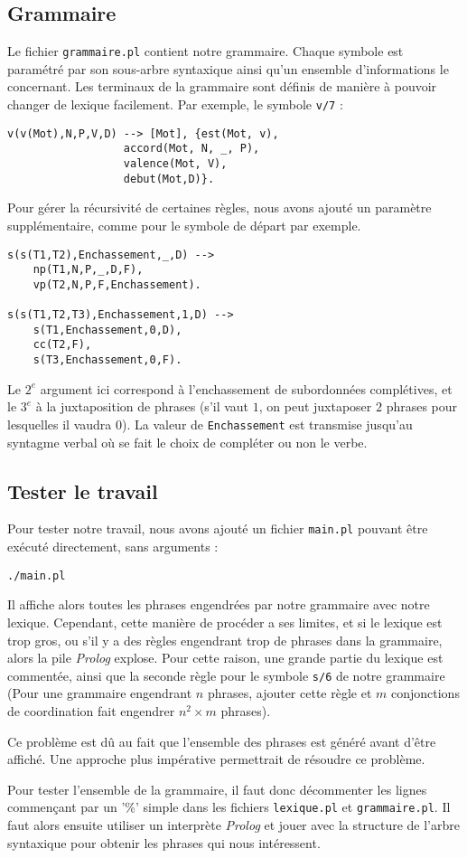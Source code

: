 \documentclass[a4paper,10pt]{article}
\newcommand\Terme\textit
\begin{document}
\subsection{Grammaire}
Le fichier \texttt{grammaire.pl} contient notre grammaire. Chaque symbole est paramétré par son sous-arbre syntaxique ainsi qu'un ensemble d'informations le concernant. Les terminaux de la grammaire sont définis de manière à pouvoir changer de lexique facilement. Par exemple, le symbole \texttt{v/7} :
\begin{verbatim}
v(v(Mot),N,P,V,D) --> [Mot], {est(Mot, v),
			      accord(Mot, N, _, P),
			      valence(Mot, V),
			      debut(Mot,D)}.
\end{verbatim}

Pour gérer la récursivité de certaines règles, nous avons ajouté un paramètre supplémentaire, comme pour le symbole de départ par exemple.
\begin{verbatim}
s(s(T1,T2),Enchassement,_,D) --> 
    np(T1,N,P,_,D,F), 
    vp(T2,N,P,F,Enchassement).

s(s(T1,T2,T3),Enchassement,1,D) --> 
    s(T1,Enchassement,0,D), 
    cc(T2,F), 
    s(T3,Enchassement,0,F).
\end{verbatim}

Le $2^e$ argument ici correspond à l'enchassement de subordonnées complétives, et le $3^e$ à la juxtaposition de phrases (s'il vaut $1$, on peut juxtaposer $2$ phrases pour lesquelles il vaudra $0$). La valeur de \texttt{Enchassement} est transmise jusqu'au syntagme verbal où se fait le choix de compléter ou non le verbe.

\subsection{Tester le travail}
Pour tester notre travail, nous avons ajouté un fichier \texttt{main.pl} pouvant être exécuté directement, sans arguments :
\begin{verbatim}
./main.pl
\end{verbatim}
Il affiche alors toutes les phrases engendrées par notre grammaire avec notre lexique. Cependant, cette manière de procéder a ses limites, et si le lexique est trop gros, ou s'il y a des règles engendrant trop de phrases dans la grammaire, alors la pile \Terme{Prolog} explose. Pour cette raison, une grande partie du lexique est commentée, ainsi que la seconde règle pour le symbole \texttt{s/6} de notre grammaire (Pour une grammaire engendrant $n$ phrases, ajouter cette règle et $m$ conjonctions de coordination fait engendrer $n^2\times m$ phrases).

Ce problème est dû au fait que l'ensemble des phrases est généré avant d'être affiché. Une approche plus impérative permettrait de résoudre ce problème.

Pour tester l'ensemble de la grammaire, il faut donc décommenter les lignes commençant par un '\%' simple dans les fichiers \texttt{lexique.pl} et \texttt{grammaire.pl}. Il faut alors ensuite utiliser un interprète \Terme{Prolog} et jouer avec la structure de l'arbre syntaxique pour obtenir les phrases qui nous intéressent.
\end{document}
